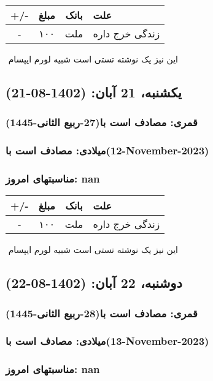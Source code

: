 \documentclass{article}
\newcommand{\rnote}[1]{\marginpar{\textcolor{color}{\StrSubstitute{\##1}{ }{\_}}}}
\newcommand{\myRow}[4]{
    #1 & #2 & #3 & #4 \\ \hline
}
\begin{document}
\begin{tabular}{ | c | c | c | p{5cm} |}
    \hline
    \myRow{ +/- }{مبلغ}{بانک}{علت}
    \myRow{-}{۱۰۰}{ملت}{زندگی خرج داره}
\end{tabular}
\newline
\newline

‌
\rnote{تست}
این نیز یک نوشته تستی است شبیه لورم ایپسام




\newpage
{}
\textcolor{color}{
\section{ یکشنبه، 21 آبان: (1402-08-21) }
\subsubsection*{قمری: مصادف است با(27-ربیع الثانی-1445)} 
\subsubsection*{میلادی: مصادف است با(12-November-2023)}
\subsubsection*{مناسبتهای امروز: nan}
}


\begin{tabular}{ | c | c | c | p{5cm} |}
    \hline
    \myRow{ +/- }{مبلغ}{بانک}{علت}
    \myRow{-}{۱۰۰}{ملت}{زندگی خرج داره}
\end{tabular}
\newline
\newline

‌
\rnote{تست}
این نیز یک نوشته تستی است شبیه لورم ایپسام




\newpage
{}
\textcolor{color}{
\section{ دوشنبه، 22 آبان: (1402-08-22) }
\subsubsection*{قمری: مصادف است با(28-ربیع الثانی-1445)} 
\subsubsection*{میلادی: مصادف است با(13-November-2023)}
\subsubsection*{مناسبتهای امروز: nan}
}
\end{document}
